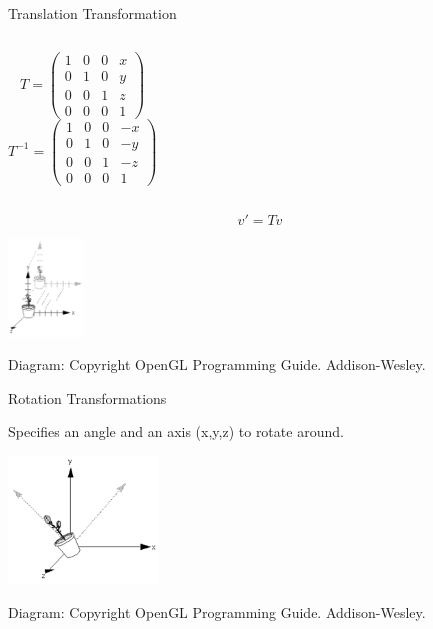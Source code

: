 \documentclass[aspectratio=1610,xcolor=dvipsnames,t]{beamer}
\newcommand{\showcode}[1]{\begin{mdframed}[style=code] %
                          \end{mdframed}%
}
\begin{document}
\begin{frame}{Translation Transformation}
    \showcode{translate.c} 
    \begin{columns}[t]
            \begin{equation*}
                T = \left(
                        \begin{array}{cccc}
                            1   & 0     & 0     & x \\
                            0   & 1     & 0     & y \\
                            0   & 0     & 1     & z \\
                            0   & 0     & 0     & 1
                        \end{array} 
                    \right)
            \end{equation*} 
            \begin{equation*}
               T^{-1} = \left(
                        \begin{array}{cccc}
                            1   & 0     & 0     & -x \\
                            0   & 1     & 0     & -y \\
                            0   & 0     & 1     & -z \\
                            0   & 0     & 0     &  1
                        \end{array} 
                    \right)
            \end{equation*} 
    \end{columns} 
    \begin{equation*}
        v' = T v
    \end{equation*} 
    \begin{center} 
        \includegraphics[width=0.15\textwidth]{translate} 
    \end{center} 
    \tiny
    Diagram: Copyright OpenGL Programming Guide. Addison-Wesley. 
    \normalsize
\end{frame} 

\begin{frame}{Rotation Transformations} 
    \showcode{rotate.c} 
    Specifies an angle and an axis (x,y,z) to rotate around.
    \begin{center} 
        \includegraphics[width=0.3\textwidth]{rotation} 
    \end{center} 
    \tiny
    Diagram: Copyright OpenGL Programming Guide. Addison-Wesley. 
    \normalsize
\end{frame} 
\end{document}
